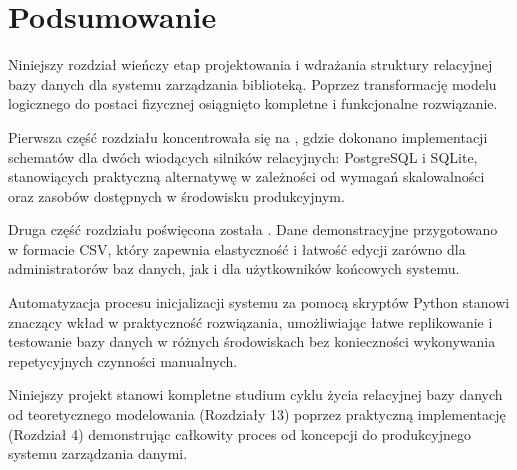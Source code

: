 \documentclass[a4paper,11pt,english,openany,oneside]{sphinxmanual}
\begin{document}
\begin{sphinxVerbatim}[commandchars=\\\{\}]
     
          
         
\end{sphinxVerbatim}


\section{Podsumowanie}
\label{\detokenize{rozdzial_4/index:podsumowanie}}
\sphinxAtStartPar
Niniejszy rozdział wieńczy etap projektowania i wdrażania struktury relacyjnej bazy danych dla systemu zarządzania biblioteką. Poprzez transformację modelu logicznego do postaci fizycznej osiągnięto kompletne i funkcjonalne rozwiązanie.

\sphinxAtStartPar
Pierwsza część rozdziału koncentrowała się na , gdzie dokonano implementacji schematów dla dwóch wiodących silników relacyjnych: PostgreSQL i SQLite, stanowiących praktyczną alternatywę w zależności od wymagań skalowalności oraz zasobów dostępnych w środowisku produkcyjnym.

\sphinxAtStartPar
Druga część rozdziału poświęcona została . Dane demonstracyjne przygotowano w formacie CSV, który zapewnia elastyczność i łatwość edycji zarówno dla administratorów baz danych, jak i dla użytkowników końcowych systemu.

\sphinxAtStartPar
Automatyzacja procesu inicjalizacji systemu za pomocą skryptów Python stanowi znaczący wkład w praktyczność rozwiązania, umożliwiając łatwe replikowanie i testowanie bazy danych w różnych środowiskach bez konieczności wykonywania repetycyjnych czynności manualnych.

\sphinxAtStartPar
Niniejszy projekt stanowi kompletne studium cyklu życia relacyjnej bazy danych \textendash{} od teoretycznego modelowania (Rozdziały 1\sphinxhyphen{}3) poprzez praktyczną implementację (Rozdział 4) \textendash{} demonstrując całkowity proces od koncepcji do produkcyjnego systemu zarządzania danymi.
\end{document}

